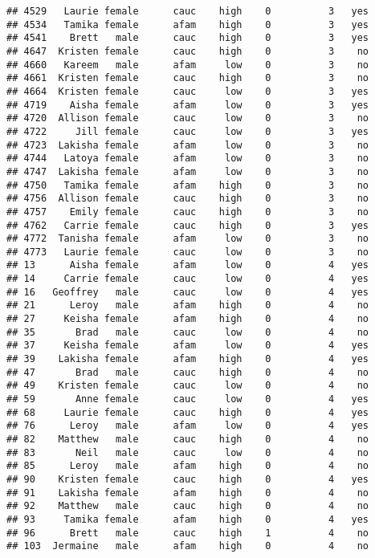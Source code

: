 \documentclass[
]{article}
\begin{document}
\begin{verbatim}
## 4529   Laurie female      cauc    high    0          3   yes
## 4534   Tamika female      afam    high    0          3   yes
## 4541    Brett   male      cauc    high    0          3   yes
## 4647  Kristen female      cauc    high    0          3    no
## 4660   Kareem   male      afam     low    0          3    no
## 4661  Kristen female      cauc    high    0          3    no
## 4664  Kristen female      cauc     low    0          3   yes
## 4719    Aisha female      afam     low    0          3   yes
## 4720  Allison female      cauc     low    0          3    no
## 4722     Jill female      cauc     low    0          3   yes
## 4723  Lakisha female      afam     low    0          3    no
## 4744   Latoya female      afam     low    0          3    no
## 4747  Lakisha female      afam     low    0          3    no
## 4750   Tamika female      afam    high    0          3    no
## 4756  Allison female      cauc    high    0          3    no
## 4757    Emily female      cauc    high    0          3    no
## 4762   Carrie female      cauc    high    0          3   yes
## 4772  Tanisha female      afam     low    0          3    no
## 4773   Laurie female      cauc     low    0          3    no
## 13      Aisha female      afam     low    0          4   yes
## 14     Carrie female      cauc     low    0          4   yes
## 16   Geoffrey   male      cauc     low    0          4   yes
## 21      Leroy   male      afam    high    0          4    no
## 27     Keisha female      afam    high    0          4    no
## 35       Brad   male      cauc     low    0          4    no
## 37     Keisha female      afam     low    0          4   yes
## 39    Lakisha female      afam    high    0          4   yes
## 47       Brad   male      cauc    high    0          4    no
## 49    Kristen female      cauc     low    0          4    no
## 59       Anne female      cauc     low    0          4   yes
## 68     Laurie female      cauc    high    0          4   yes
## 76      Leroy   male      afam     low    0          4   yes
## 82    Matthew   male      cauc    high    0          4    no
## 83       Neil   male      cauc     low    0          4    no
## 85      Leroy   male      afam    high    0          4    no
## 90    Kristen female      cauc    high    0          4   yes
## 91    Lakisha female      afam    high    0          4    no
## 92    Matthew   male      cauc    high    0          4    no
## 93     Tamika female      afam    high    0          4   yes
## 96      Brett   male      cauc    high    1          4    no
## 103  Jermaine   male      afam    high    0          4    no

\end{verbatim}
\end{document}
